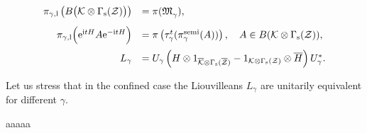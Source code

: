 \documentclass{svmult}
\def\bet{\begin{theorem}}
\def\eet{\end{theorem}}
\def\PF{{}}
\def\semi{{\rm semi}}
\def\bar{\overline}
\def\l{{\rm l}}
\def\s{{\rm s}}
\def\cZ{{\cal Z}}
\def\fM{{\mathfrak M}}
\def\i{{\rm i}}
\def\e{{\rm e}}
\def\l{{\rm l}}
\def\cK{{\cal K}}
\def\e{{\rm e}}
\def\s{{\rm s}}
\begin{document}
\begin{remark}
\bet 
\[\begin{array}{rl}
\pi_{\gamma,\l}\left(B\bigl(\cK\otimes\Gamma_\s(\cZ)\bigr)\right)
&=\pi(\fM_\gamma^\PF),\\[3mm]
\pi_{\gamma,\l}\Big(\e^{\i tH}A\e^{-\i
tH}\Big)
&=\pi\left(\tau_\gamma^t(\pi_\gamma^\semi(A))\right)
,\ \ \ A\in B(\cK\otimes \Gamma_\s(\cZ)),\\[3mm]
L_\gamma
&=U_\gamma\left(H\otimes1_{\bar\cK\otimes\Gamma_\s(\bar\cZ)}
-1_{\cK\otimes\Gamma_\s(\cZ)}\otimes \bar H\right) U_\gamma^*
.\end{array}\]
\eet

 Let
 us stress that in the confined case
 the Liouvilleans $L_\gamma$ are unitarily equivalent for
 different $\gamma$.









\begin{thebibliography}{aaaaa}



\end{thebibliography}
\end{remark}
\end{document}
